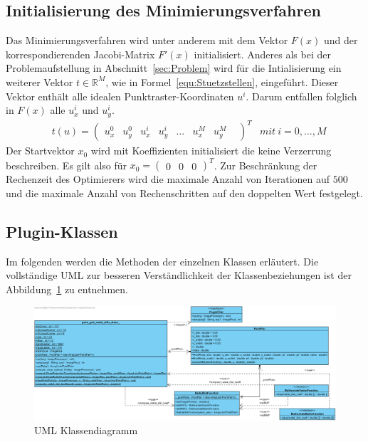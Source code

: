 \subsection{Initialisierung des Minimierungsverfahren}
\label{sec:Minimierung}
Das Minimierungsverfahren wird unter anderem mit dem Vektor $F(x)$ und der korrespondierenden Jacobi-Matrix $F'(x)$ initialisiert. Anderes als bei der Problemaufstellung in Abschnitt~\ref{sec:Problem} wird für die Intialisierung ein weiterer Vektor $t \in \mathbb{R}^M$, wie in Formel~\ref{equ:Stuetzstellen}, eingeführt. Dieser Vektor enthält alle idealen Punktraster-Koordinaten $u^i$. Darum entfallen folglich in $F(x)$ alle $u_x^i$ und $u_y^i$.
\begin{equation}
\label{equ:Stuetzstellen}
\begin{aligned}
&t(u)=
\begin{pmatrix}
u_x^0&
u_y^0&
u_x^i&
u_y^i&
\dots&
u_x^M&
u_y^M&
\end{pmatrix}^T
&mit\ i = 0,\dots,M
\end{aligned}
\end{equation}
Der Startvektor $x_0$ wird mit Koeffizienten initialisiert die keine Verzerrung beschreiben. Es gilt also für $x_0 = \begin{pmatrix}
0 & 0 & 0
\end{pmatrix}^T$. Zur Beschränkung der Rechenzeit des Optimierers wird die maximale Anzahl von Iterationen auf $500$ und die maximale Anzahl von Rechenschritten auf den doppelten Wert festgelegt.


\subsection{Plugin-Klassen}
\label{sec:PluginKlassen}

Im folgenden werden die Methoden der einzelnen Klassen erläutert. Die vollständige UML zur besseren Verständlichkeit der Klassenbeziehungen ist der Abbildung~\ref{img:UML} zu entnehmen.

\begin{figure}[H] %
	\center
	\includegraphics[width=\textheight, angle =90]{Images/Class Diagram1.png}
	\caption{UML Klassendiagramm}
	\label{img:UML}
\end{figure}

